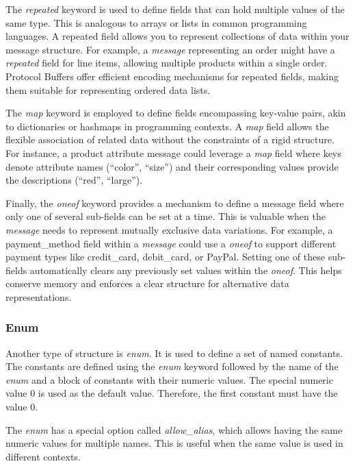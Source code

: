 The \textit{repeated} keyword is used to define fields that can hold multiple values of the same type.
This is analogous to arrays or lists in common programming languages.
A repeated field allows you to represent collections of data within your message structure.
For example, a \textit{message} representing an order might have a \textit{repeated} field for line items, allowing multiple products within a single order.
Protocol Buffers offer efficient encoding mechanisms for repeated fields, making them suitable for representing ordered data lists.
\cite{protobuf-proto3}

The \textit{map} keyword is employed to define fields encompassing key-value pairs, akin to dictionaries or hashmaps in programming contexts.
A \textit{map} field allows the flexible association of related data without the constraints of a rigid structure.
For instance, a product attribute message could leverage a \textit{map} field where keys denote attribute names (``color'', ``size'') and their corresponding values provide the descriptions (``red'', ``large'').
\cite{protobuf-proto3}

Finally, the \textit{oneof} keyword provides a mechanism to define a message field where only one of several sub-fields can be set at a time.
This is valuable when the \textit{message} needs to represent mutually exclusive data variations.
For example, a payment\_method field within a \textit{message} could use a \textit{oneof} to support different payment types like credit\_card, debit\_card, or PayPal.
Setting one of these sub-fields automatically clears any previously set values within the \textit{oneof}.
This helps conserve memory and enforces a clear structure for alternative data representations.
\cite{protobuf-proto3}

\subsubsection{Enum}
Another type of structure is \textit{enum}.
It is used to define a set of named constants.
The constants are defined using the \textit{enum} keyword followed by the name of the \textit{enum} and a block of constants with their numeric values.
The special numeric value 0 is used as the default value.
Therefore, the first constant must have the value 0.
\cite{protobuf-proto3}

The \textit{enum} has a special option called \textit{allow\_alias}, which allows having the same numeric values for multiple names.
This is useful when the same value is used in different contexts.
\cite{protobuf-proto3}

